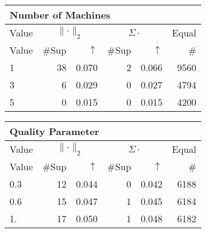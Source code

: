 \begin{center}
\renewcommand{\tabcolsep}{4pt}
\renewcommand{\arraystretch}{1.1}
\begin{customnormal}
\begin{tabular}{lrrrrr}
\multicolumn{6}{l}{Number of Machines}\\
\toprule
\multicolumn{1}{c}{Value} & \multicolumn{2}{c}{$\lVert \cdot \rVert_2$} & \multicolumn{2}{c}{$\Sigma \cdot$} & \multicolumn{1}{c}{Equal} \\ 
\cmidrule(lr){1-1} \cmidrule(lr){2-3} \cmidrule(lr){4-5}  \cmidrule(lr){6-6}
Value & \#Sup & $\uparrow$ & \#Sup & $\uparrow$ & \# \\ 
\midrule
1 & 38 & 0.070 & 2 & 0.066 & 9560 \\ 
3 & 6 & 0.029 & 0 & 0.027 & 4794 \\ 
5 & 0 & 0.015 & 0 & 0.015 & 4200 \\ 
\bottomrule
\end{tabular}


\end{customnormal}
\end{center}
\begin{center}
\renewcommand{\tabcolsep}{4pt}
\renewcommand{\arraystretch}{1.1}
\begin{customnormal}
\begin{tabular}{lrrrrr}
\multicolumn{6}{l}{Quality Parameter}\\
\toprule
\multicolumn{1}{c}{Value} & \multicolumn{2}{c}{$\lVert \cdot \rVert_2$} & \multicolumn{2}{c}{$\Sigma \cdot$} & \multicolumn{1}{c}{Equal} \\ 
\cmidrule(lr){1-1} \cmidrule(lr){2-3} \cmidrule(lr){4-5}  \cmidrule(lr){6-6}
Value & \#Sup & $\uparrow$ & \#Sup & $\uparrow$ & \# \\ 
\midrule
0.3 & 12 & 0.044 & 0 & 0.042 & 6188 \\ 
0.6 & 15 & 0.047 & 1 & 0.045 & 6184 \\ 
1. & 17 & 0.050 & 1 & 0.048 & 6182 \\ 
\bottomrule
\end{tabular}


\end{customnormal}
\end{center}
